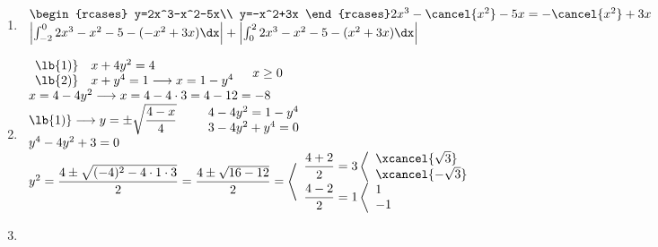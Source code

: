 

\begin{enumerate}[label=\color{red}\textbf{\arabic*)}, leftmargin=*]
	\item {}
      
      $\begin{array}{l}
            \begin{rcases}
            y=2x^3-x^2-5x\\
            y=-x^2+3x
      \end{rcases}2x^3-\cancel{x^2}-5x=-\cancel{x^2}+3x\\
      \left|\int_{-2}^{0}2x^3-x^2-5-(-x^2+3x)\dx\right|+\left|\int_{0}^{2}2x^3-x^2-5-(x^2+3x)\dx\right|
      \end{array}$
      
	\item {}
      
      $\begin{array}{l}
            \begin{array}{ll}
                  \lb{1)} & x+4y^2=4\\
                  \lb{2)} & x+y^4=1\longrightarrow x=1-y^4
            \end{array}\quad x\ge0\\
            x=4-4y^2\longrightarrow x=4-4\cdot3=4-12=-8\\
            \lb{1)}\longrightarrow y=\pm\sqrt{\dfrac{4-x}{4}}\qquad\begin{array}{l}
                  4-4y^2=1-y^4\\
                  3-4y^2+y^4=0
            \end{array}\\
            y^4-4y^2+3=0\\
            y^2=\dfrac{4\pm\sqrt{(-4)^2-4\cdot1\cdot3}}{2}=\dfrac{4\pm\sqrt{16-12}}{2}=\left\langle\begin{array}{l}
                  \dfrac{4+2}{2}=3\left\langle\begin{array}{l}
                        \xcancel{\sqrt{3}}\\
                        \xcancel{-\sqrt{3}}
                  \end{array}\right. \\
                  \dfrac{4-2}{2}=1\left\langle\begin{array}{l}
                        1\\
                        -1
                  \end{array}\right.
            \end{array}\right. 
      \end{array}$
	\item {}
      

\end{enumerate}
